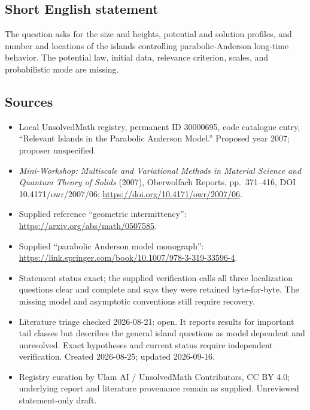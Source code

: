 \documentclass[11pt]{article}
\begin{document}
\subsection{Short English statement}
The question asks for the size and heights, potential and solution profiles, and number and locations of the islands controlling parabolic-Anderson long-time behavior. The potential law, initial data, relevance criterion, scales, and probabilistic mode are missing.
\subsection{Sources}
\begin{itemize}
\item Local UnsolvedMath registry, permanent ID 30000695, code catalogue entry, ``Relevant Islands in the Parabolic Anderson Model.'' Proposed year 2007; proposer unspecified.
\item \emph{Mini-Workshop: Multiscale and Variational Methods in Material Science and Quantum Theory of Solids} (2007), Oberwolfach Reports, pp.\ 371--416, DOI 10.4171/owr/2007/06; \url{https://doi.org/10.4171/owr/2007/06}.
\item Supplied reference ``geometric intermittency'': \url{https://arxiv.org/abs/math/0507585}.
\item Supplied ``parabolic Anderson model monograph'': \url{https://link.springer.com/book/10.1007/978-3-319-33596-4}.
\item Statement status exact; the supplied verification calls all three localization questions clear and complete and says they were retained byte-for-byte. The missing model and asymptotic conventions still require recovery.
\item Literature triage checked 2026-08-21: open. It reports results for important tail classes but describes the general island questions as model dependent and unresolved. Exact hypotheses and current status require independent verification. Created 2026-08-25; updated 2026-09-16.
\item Registry curation by Ulam AI / UnsolvedMath Contributors, CC BY 4.0; underlying report and literature provenance remain as supplied. Unreviewed statement-only draft.
\end{itemize}
\end{document}
